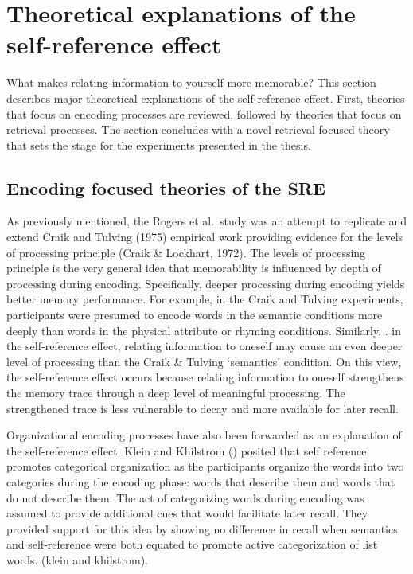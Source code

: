 \documentclass[
  man,floatsintext]{apa6}
\begin{document}
\hypertarget{theoretical-explanations-of-the-self-reference-effect}{%
\section{Theoretical explanations of the self-reference effect}\label{theoretical-explanations-of-the-self-reference-effect}}

What makes relating information to yourself more memorable? This section describes major theoretical explanations of the self-reference effect. First, theories that focus on encoding processes are reviewed, followed by theories that focus on retrieval processes. The section concludes with a novel retrieval focused theory that sets the stage for the experiments presented in the thesis.

\hypertarget{encoding-focused-theories-of-the-sre}{%
\subsection{Encoding focused theories of the SRE}\label{encoding-focused-theories-of-the-sre}}

As previously mentioned, the Rogers et al.~study was an attempt to replicate and extend Craik and Tulving (1975) empirical work providing evidence for the levels of processing principle (Craik \& Lockhart, 1972). The levels of processing principle is the very general idea that memorability is influenced by depth of processing during encoding. Specifically, deeper processing during encoding yields better memory performance. For example, in the Craik and Tulving experiments, participants were presumed to encode words in the semantic conditions more deeply than words in the physical attribute or rhyming conditions. Similarly, . in the self-reference effect, relating information to oneself may cause an even deeper level of processing than the Craik \& Tulving `semantics' condition. On this view, the self-reference effect occurs because relating information to oneself strengthens the memory trace through a deep level of meaningful processing. The strengthened trace is less vulnerable to decay and more available for later recall.

Organizational encoding processes have also been forwarded as an explanation of the self-reference effect. Klein and Khilstrom () posited that self reference promotes categorical organization as the participants organize the words into two categories during the encoding phase: words that describe them and words that do not describe them. The act of categorizing words during encoding was assumed to provide additional cues that would facilitate later recall. They provided support for this idea by showing no difference in recall when semantics and self-reference were both equated to promote active categorization of list words. (klein and khilstrom).
\end{document}

